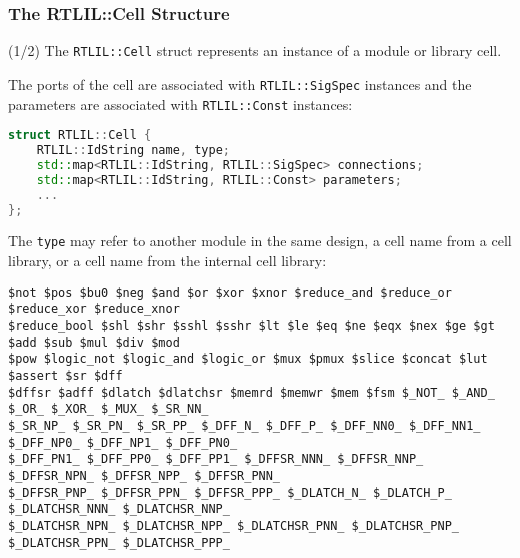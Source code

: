 \subsubsection{The RTLIL::Cell Structure}

\begin{frame}[t, fragile]{\subsubsecname (1/2)}
The {\tt RTLIL::Cell} struct represents an instance of a module or library cell.

\smallskip
The ports of the cell
are associated with {\tt RTLIL::SigSpec} instances and the parameters are associated with {\tt RTLIL::Const}
instances:

\bigskip
\begin{lstlisting}[xleftmargin=1cm, basicstyle=\ttfamily\fontsize{8pt}{10pt}\selectfont, language=C++]
struct RTLIL::Cell {
    RTLIL::IdString name, type;
    std::map<RTLIL::IdString, RTLIL::SigSpec> connections;
    std::map<RTLIL::IdString, RTLIL::Const> parameters;
    ...
};
\end{lstlisting}

\bigskip
The {\tt type} may refer to another module in the same design, a cell name from a cell library, or a
cell name from the internal cell library:

\begin{lstlisting}[xleftmargin=1cm, basicstyle=\ttfamily\fontsize{6pt}{7pt}\selectfont]
$not $pos $bu0 $neg $and $or $xor $xnor $reduce_and $reduce_or $reduce_xor $reduce_xnor
$reduce_bool $shl $shr $sshl $sshr $lt $le $eq $ne $eqx $nex $ge $gt $add $sub $mul $div $mod
$pow $logic_not $logic_and $logic_or $mux $pmux $slice $concat $lut $assert $sr $dff
$dffsr $adff $dlatch $dlatchsr $memrd $memwr $mem $fsm $_NOT_ $_AND_ $_OR_ $_XOR_ $_MUX_ $_SR_NN_
$_SR_NP_ $_SR_PN_ $_SR_PP_ $_DFF_N_ $_DFF_P_ $_DFF_NN0_ $_DFF_NN1_ $_DFF_NP0_ $_DFF_NP1_ $_DFF_PN0_
$_DFF_PN1_ $_DFF_PP0_ $_DFF_PP1_ $_DFFSR_NNN_ $_DFFSR_NNP_ $_DFFSR_NPN_ $_DFFSR_NPP_ $_DFFSR_PNN_
$_DFFSR_PNP_ $_DFFSR_PPN_ $_DFFSR_PPP_ $_DLATCH_N_ $_DLATCH_P_ $_DLATCHSR_NNN_ $_DLATCHSR_NNP_
$_DLATCHSR_NPN_ $_DLATCHSR_NPP_ $_DLATCHSR_PNN_ $_DLATCHSR_PNP_ $_DLATCHSR_PPN_ $_DLATCHSR_PPP_
\end{lstlisting}
\end{frame}

